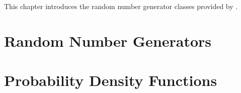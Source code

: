 
This chapter introduces the random number generator classes provided by .

\section{Random Number Generators}

\section{Probability Density Functions}
